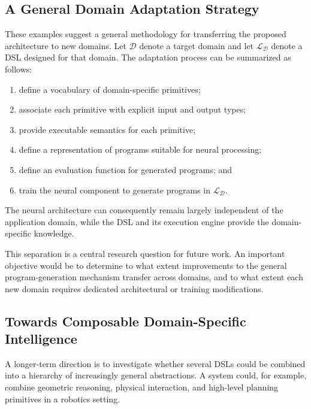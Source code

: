 \documentclass[final]{nesy2027}
\begin{document}
\subsection{A General Domain Adaptation Strategy}
\label{subsec:perspectives-generalization}

These examples suggest a general methodology for transferring the proposed
architecture to new domains. Let $\mathcal{D}$ denote a target domain and
let $\mathcal{L}_{\mathcal{D}}$ denote a DSL designed for that domain. The
adaptation process can be summarized as follows:

\begin{enumerate}
    \item define a vocabulary of domain-specific primitives;
    \item associate each primitive with explicit input and output types;
    \item provide executable semantics for each primitive;
    \item define a representation of programs suitable for neural processing;
    \item define an evaluation function for generated programs; and
    \item train the neural component to generate programs in
          $\mathcal{L}_{\mathcal{D}}$.
\end{enumerate}

The neural architecture can consequently remain largely independent of the
application domain, while the DSL and its execution engine provide the
domain-specific knowledge.

This separation is a central research question for future work. An important
objective would be to determine to what extent improvements to the general
program-generation mechanism transfer across domains, and to what extent
each new domain requires dedicated architectural or training modifications.

\subsection{Towards Composable Domain-Specific Intelligence}
\label{subsec:perspectives-composable}

A longer-term direction is to investigate whether several DSLs could be
combined into a hierarchy of increasingly general abstractions. A system
could, for example, combine geometric reasoning, physical interaction, and
high-level planning primitives in a robotics setting.
\end{document}
